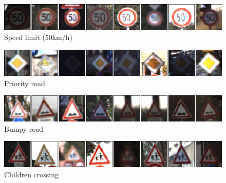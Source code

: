 		\begin{figure}[H]
			\begin{center}
			\includegraphics[width=1\textwidth]{images/desarrollo/imagenes/1__(3).png}
			\end{center}
			\begin{center}
			\caption{\small{Speed limit (50km/h)}}
			\end{center}
			\vspace{-1.5em}
		\end{figure}

		\begin{figure}[H]
			\begin{center}
			\includegraphics[width=1\textwidth]{images/desarrollo/imagenes/1__(13).png}
			\end{center}
			\begin{center}
			\caption{\small{Priority road}}
			\end{center}
			\vspace{-1.5em}
		\end{figure}
		
		\begin{figure}[H]
			\begin{center}
			\includegraphics[width=1\textwidth]{images/desarrollo/imagenes/1__(23).png}
			\end{center}
			\begin{center}
			\caption{\small{Bumpy road}}
			\end{center}
			\vspace{-1.5em}
		\end{figure}

		\begin{figure}[H]
			\begin{center}
			\includegraphics[width=1\textwidth]{images/desarrollo/imagenes/1__(29).png}
			\end{center}
			\begin{center}
			\caption{\small{Children crossing}}
			\end{center}
			\vspace{-1.5em}
		\end{figure}
		

